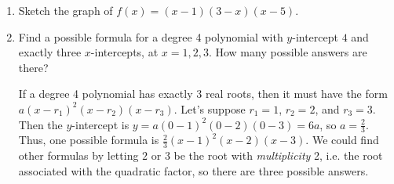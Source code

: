 \documentclass{article}
\begin{document}
\begin{enumerate}[resume, topsep=0pt]
\begin{enumerate}
    \begin{problem}[\vfill]
      What can you say about the number of turning points of $f$?
    \end{problem}

    \begin{solution}
      If $f$ has degree $n$, then $f'$ has degree $n-1$, so $f'$ has
      at most $n-1$ roots, and thus $f$ has at most $n-1$ turning points.
      Also, because of the end behavior, if $n$ is even, then there must
      be an odd number of turning points, and if $n$ is odd, then there
      must be an even number of turning points.
    \end{solution}

  \end{enumerate}

\item 

  \begin{problem}[\stretch{2}]
    Sketch the graph of $f(x) = (x - 1)(3 - x)(x - 5)$.
  \end{problem}

  \begin{solution}
    \begin{center}
    \end{center}
  \end{solution}

\item 
  \begin{problem}[\vfill\newpage]
    Find a possible formula for a degree 4 polynomial with $y$-intercept $4$ and exactly three $x$-intercepts, at $x = 1, 2, 3$. How many possible answers are there?
  \end{problem}

  \begin{solution}
    If a degree 4 polynomial has exactly 3 real roots, then it
    must have the form $a(x-r_1)^2(x-r_2)(x-r_3)$. Let's suppose
    $r_1=1$, $r_2=2$, and $r_3=3$. Then the $y$-intercept is $y=a(0-1)^2(0-2)(0-3)=6a$, so $a=\frac{2}{3}$.
    Thus, one possible formula is $\frac{2}{3}(x-1)^2(x-2)(x-3)$. We
    could find other formulas by letting $2$ or $3$ be the root with
    \textit{multiplicity} 2, i.e. the root associated with the quadratic
    factor, so there are three possible answers.
  \end{solution}


\end{enumerate}
\end{document}
